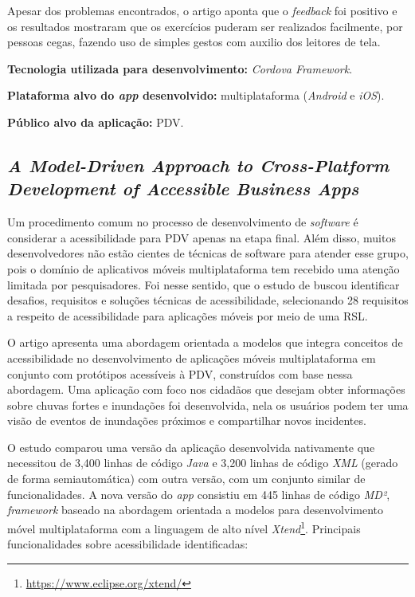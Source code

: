 Apesar dos problemas encontrados, o artigo aponta que o \emph{feedback} foi positivo e os resultados mostraram que os exercícios puderam ser realizados facilmente, por pessoas cegas,
fazendo uso de simples gestos com auxilio dos leitores de tela.

\textbf{Tecnologia utilizada para desenvolvimento:} \emph{Cordova Framework}.

\textbf{Plataforma alvo do \emph{app} desenvolvido:} multiplataforma (\emph{Android} e \emph{iOS}).

\textbf{Público alvo da aplicação:} PDV\@.

\subsection{\emph{A Model-Driven Approach to Cross-Platform Development of Accessible Business Apps}}

Um procedimento comum no processo de desenvolvimento de \emph{software} é considerar a acessibilidade para PDV apenas na etapa final.
Além disso, muitos desenvolvedores não estão cientes de técnicas de software para atender esse grupo, pois o domínio de aplicativos
móveis multiplataforma tem recebido uma atenção limitada por pesquisadores. Foi nesse sentido, que o estudo de 
buscou identificar desafios, requisitos e soluções técnicas de acessibilidade, selecionando 28 requisitos a respeito de acessibilidade para
aplicações móveis por meio de uma RSL\@.

O artigo apresenta uma abordagem orientada a modelos que integra conceitos de acessibilidade no desenvolvimento de aplicações móveis multiplataforma em conjunto com protótipos
acessíveis à PDV, construídos com base nessa abordagem. Uma aplicação com foco nos cidadãos que desejam obter informações sobre chuvas fortes e inundações foi desenvolvida, nela
os usuários podem ter uma visão de eventos de inundações próximos e compartilhar novos incidentes.

O estudo comparou uma versão da aplicação desenvolvida nativamente que necessitou de 3,400 linhas de código \emph{Java} e 3,200 linhas de código \emph{XML}
(gerado de forma semiautomática) com outra versão, com um conjunto similar de funcionalidades. A nova versão do \emph{app} consistiu em 445 linhas de código \emph{MD²}, \emph{framework}
baseado na abordagem orientada a modelos para desenvolvimento móvel multiplataforma com a linguagem de alto nível \emph{Xtend}\footnote{\url{https://www.eclipse.org/xtend/}}.
Principais funcionalidades sobre acessibilidade identificadas:

